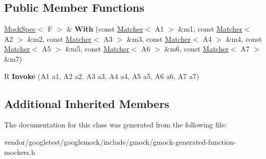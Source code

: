 \subsection*{Public Member Functions}
\begin{DoxyCompactItemize}
\item 
\hyperlink{classtesting_1_1internal_1_1MockSpec}{Mock\+Spec}$<$ F $>$ \& {\bfseries With} (const \hyperlink{classtesting_1_1Matcher}{Matcher}$<$ A1 $>$ \&m1, const \hyperlink{classtesting_1_1Matcher}{Matcher}$<$ A2 $>$ \&m2, const \hyperlink{classtesting_1_1Matcher}{Matcher}$<$ A3 $>$ \&m3, const \hyperlink{classtesting_1_1Matcher}{Matcher}$<$ A4 $>$ \&m4, const \hyperlink{classtesting_1_1Matcher}{Matcher}$<$ A5 $>$ \&m5, const \hyperlink{classtesting_1_1Matcher}{Matcher}$<$ A6 $>$ \&m6, const \hyperlink{classtesting_1_1Matcher}{Matcher}$<$ A7 $>$ \&m7)\hypertarget{classtesting_1_1internal_1_1FunctionMocker_3_01R_07A1_00_01A2_00_01A3_00_01A4_00_01A5_00_01A6_00_01A7_08_4_abaa600e7ae355a1579d1c02a4ea726fb}{}\label{classtesting_1_1internal_1_1FunctionMocker_3_01R_07A1_00_01A2_00_01A3_00_01A4_00_01A5_00_01A6_00_01A7_08_4_abaa600e7ae355a1579d1c02a4ea726fb}

\item 
R {\bfseries Invoke} (A1 a1, A2 a2, A3 a3, A4 a4, A5 a5, A6 a6, A7 a7)\hypertarget{classtesting_1_1internal_1_1FunctionMocker_3_01R_07A1_00_01A2_00_01A3_00_01A4_00_01A5_00_01A6_00_01A7_08_4_a9088342f6d93448dba290e565c006979}{}\label{classtesting_1_1internal_1_1FunctionMocker_3_01R_07A1_00_01A2_00_01A3_00_01A4_00_01A5_00_01A6_00_01A7_08_4_a9088342f6d93448dba290e565c006979}

\end{DoxyCompactItemize}
\subsection*{Additional Inherited Members}


The documentation for this class was generated from the following file\+:\begin{DoxyCompactItemize}
\item 
vendor/googletest/googlemock/include/gmock/gmock-\/generated-\/function-\/mockers.\+h\end{DoxyCompactItemize}

